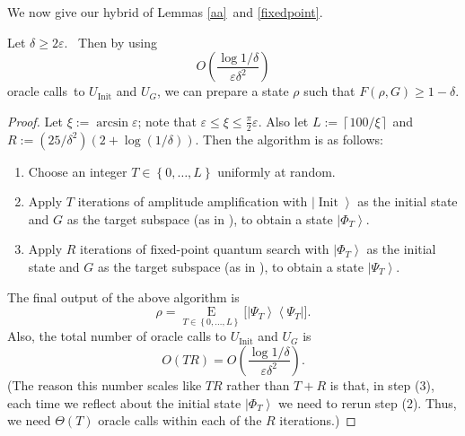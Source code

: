 We now give our hybrid of Lemmas \ref{aa}\ and \ref{fixedpoint}.

\begin{theorem}
\label{combined}Let $\delta\geq2\varepsilon$.
\ Then by using \[
O\left(  \frac{\log1/\delta}{\varepsilon\delta^{2}}\right)
\]
oracle calls\ to $U_{\operatorname*{Init}}$ and $U_{G}$, we can prepare a
state $\rho$ such that $F\left(  \rho,G\right)  \geq1-\delta$.
\end{theorem}

\begin{proof}
Let $\xi:=\arcsin\varepsilon$; note that $\varepsilon\leq\xi\leq\frac{\pi}%
{2}\varepsilon$. Also let $L:=\left\lceil 100/\xi\right\rceil $ and
$R:=({25}/{\delta^{2}})\left(  2+\log({1}/{\delta})\right)  $. Then the
algorithm is as follows:

\begin{enumerate}
\item[(1)] Choose an integer $T\in\left\{  0,\ldots,L\right\}  $ uniformly at random.

\item[(2)] Apply $T$ iterations of amplitude amplification with $\left\vert
\operatorname*{Init}\right\rangle $ as the initial state and $G$ as the
target subspace (as in ), to obtain a state $\left\vert \Phi
_{T}\right\rangle $.

\item[(3)] Apply $R$ iterations of fixed-point quantum search with
$\left\vert \Phi_{T}\right\rangle $ as the initial state and $G$ as the
target subspace (as in ), to obtain a state $\left\vert
\Psi_{T}\right\rangle $.
\end{enumerate}

The final output of the above algorithm is
\[
\rho=\operatorname*{E}_{T\in\left\{  0,\ldots,L\right\}  }\bigl[  \left\vert
\Psi_{T}\right\rangle \left\langle \Psi_{T}\right\vert \bigr]  .
\]
Also, the total number of oracle calls to $U_{\operatorname*{Init}}$ and
$U_{G}$ is%
\[
O\left(  TR\right)  =O\left(  \frac{\log1/\delta}{\varepsilon\delta^{2}%
}\right)  .
\]
(The reason this number scales like $TR$ rather than $T+R$ is that, in step
(3), each time we reflect about the initial state $\left\vert \Phi
_{T}\right\rangle $ we need to rerun step (2). Thus, we need $\Theta\left(
T\right)  $ oracle calls within each of the $R$ iterations.)


\end{proof}
